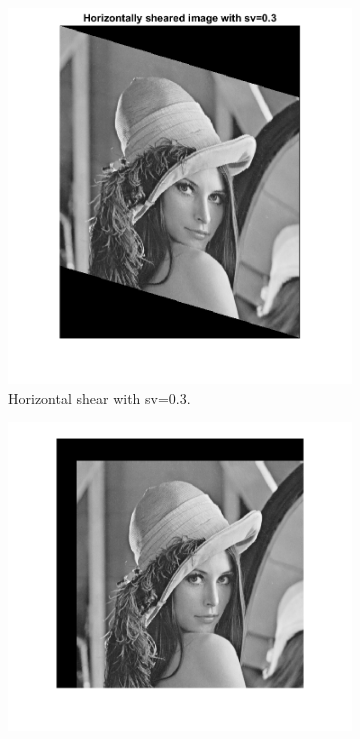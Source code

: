 \documentclass[14pt]{article}
\begin{document}
\begin{figure}[hbt!]
\begin{subfigure}[b]{0.23\linewidth}
			\includegraphics[width=\linewidth]{Hshear.png}
			\caption{Horizontal shear with sv=0.3.}
		\end{subfigure}
		\begin{subfigure}[b]{0.23\linewidth}
			\includegraphics[width=\linewidth]{trans50-45.png}

\end{subfigure}
\end{figure}
\end{document}
